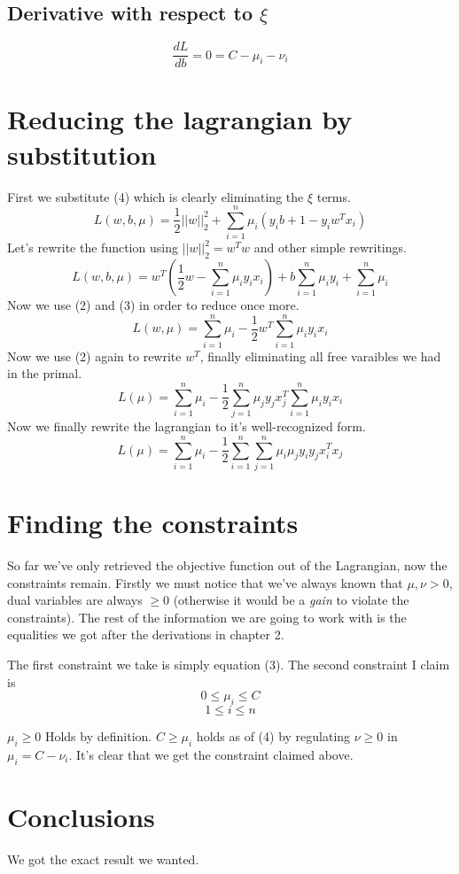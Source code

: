 \documentclass[a4paper,11pt]{article}
\begin{document}
\subsection{Derivative with respect to $\xi$}
  \begin{equation}
    \frac{dL}{db} = 0 = C - \mu_i - \nu_i
  \end{equation}

\section{Reducing the lagrangian by substitution}
First we substitute (4) which is clearly eliminating the $\xi$ terms.
\begin{equation}
  L(w, b, \mu) = \frac{1}{2} ||w||^2_2 + \sum\limits_{i=1}^n {\mu_i(y_ib + 1 - y_iw^Tx_i)}
\end{equation}
Let's rewrite the function using $ ||w||^2_2 = w^Tw $ and other simple rewritings.
\begin{equation}
  L(w, b, \mu) = w^T(\frac{1}{2}w - \sum\limits_{i=1}^n {\mu_iy_ix_i}) + b\sum\limits_{i=1}^n {\mu_iy_i} + \sum\limits_{i=1}^n {\mu_i}
\end{equation}
Now we use (2) and (3) in order to reduce once more.
\begin{equation}
  L(w, \mu) = \sum\limits_{i=1}^n {\mu_i} - \frac{1}{2} w^T \sum\limits_{i=1}^n{\mu_iy_ix_i} 
\end{equation}
Now we use (2) again to rewrite $w^T$, finally eliminating all free varaibles we had in the primal.
\begin{equation}
  L(\mu) = \sum\limits_{i=1}^n {\mu_i} - \frac{1}{2} \sum\limits_{j=1}^n{\mu_jy_jx_j^T} \sum\limits_{i=1}^n{\mu_iy_ix_i} 
\end{equation}
Now we finally rewrite the lagrangian to it's well-recognized form.
\begin{equation}
  L(\mu) = \sum\limits_{i=1}^n {\mu_i} - \frac{1}{2} \sum\limits_{i=1}^n \sum\limits_{j=1}^n{\mu_i\mu_jy_iy_jx_i^Tx_j}
\end{equation}
\section{Finding the constraints}
So far we've only retrieved the objective function out of the Lagrangian, now the constraints remain.
Firstly we must notice that we've always known that $ \mu,\nu > 0 $,
dual variables are always $\ge 0$ (otherwise it would be
a \textit{gain} to violate the constraints).
The rest of the information we are going to work with is the equalities
we got after the derivations in chapter 2.


The first constraint we take is simply equation (3). The second constraint I claim is
$$ 0 \le \mu_i \le C $$
$$ 1 \le     i \le n $$ 

$\mu_i \ge 0$ Holds by definition. $C \ge \mu_i$ holds as of (4) by regulating $\nu \ge 0$
in $\mu_i = C - \nu_i$. It's clear that we get the constraint claimed above.

\section{Conclusions}
We got the exact result we wanted.
\end{document}
